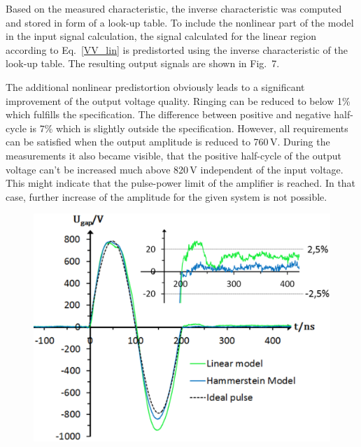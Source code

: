 \documentclass[a4paper,
               keeplastbox,%
               nospread%
              ]{jacow}
\begin{document}
	Based on the measured characteristic, the inverse characteristic was computed and stored in form of a look-up table. To include the nonlinear
	part of the model in the input signal calculation, the signal calculated for the linear region according to Eq.~\eqref{VV_lin} is predistorted
	using the inverse characteristic of the look-up table. The resulting output signals are shown in Fig.~7.

	 The additional nonlinear predistortion obviously leads to a significant improvement of the output voltage quality. Ringing
	 can be reduced to below 1\% which fulfills the specification. The difference between positive and negative half-cycle is 7\% which is slightly 
	 outside the specification. However, all requirements can be satisfied when the output amplitude is reduced to 760\,V.
	 During the measurements it also became visible, that the positive half-cycle of the output voltage can't be increased much above 820\,V independent of the input
	 voltage. This might indicate that the pulse-power limit of the amplifier is reached. In that case, further increase of the amplitude for the given
	 system is not possible.
	 	
	\begin{figure}[h]
       \vspace*{-.5\baselineskip}
	\begin{center}
	 \includegraphics[scale=0.36]{WEPVA047f7.eps}
	 \label{Vergleich}
	 \end{center}	 
	 \vspace*{-\baselineskip}
	\end{figure} 
	
\end{document}
